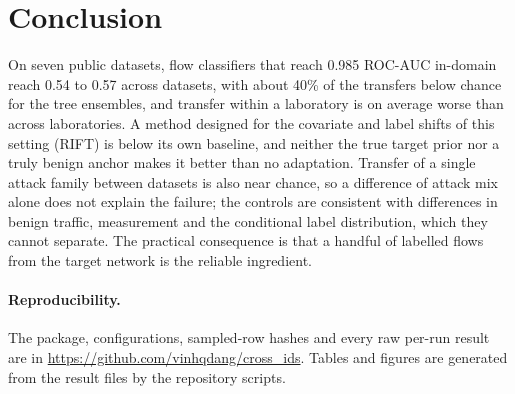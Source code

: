 \documentclass[11pt]{article}
\begin{document}
\section{Conclusion}
On seven public datasets, flow classifiers that reach 0.985 ROC-AUC in-domain reach 0.54 to 0.57 across datasets, with about 40\% of the transfers below chance for the tree ensembles, and transfer within a laboratory is on average worse than across laboratories.
A method designed for the covariate and label shifts of this setting (RIFT) is below its own baseline, and neither the true target prior nor a truly benign anchor makes it better than no adaptation.
Transfer of a single attack family between datasets is also near chance, so a difference of attack mix alone does not explain the failure; the controls are consistent with differences in benign traffic, measurement and the conditional label distribution, which they cannot separate.
The practical consequence is that a handful of labelled flows from the target network is the reliable ingredient.

\paragraph{Reproducibility.}
The package, configurations, sampled-row hashes and every raw per-run result are in \url{https://github.com/vinhqdang/cross_ids}. Tables and figures are generated from the result files by the repository scripts.



\end{document}
